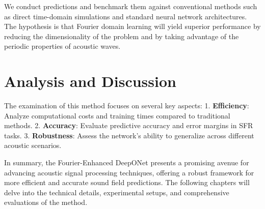 We conduct predictions and benchmark them against conventional methods such as direct time-domain simulations and standard neural network architectures. The hypothesis is that Fourier domain learning will yield superior performance by reducing the dimensionality of the problem and by taking advantage of the periodic properties of acoustic waves.

\section{Analysis and Discussion}

The examination of this method focuses on several key aspects:
1. \textbf{Efficiency}: Analyze computational costs and training times compared to traditional methods.
2. \textbf{Accuracy}: Evaluate predictive accuracy and error margins in SFR tasks.
3. \textbf{Robustness}: Assess the network's ability to generalize across different acoustic scenarios.

In summary, the Fourier-Enhanced DeepONet presents a promising avenue for advancing acoustic signal processing techniques, offering a robust framework for more efficient and accurate sound field predictions. The following chapters will delve into the technical details, experimental setups, and comprehensive evaluations of the method.
